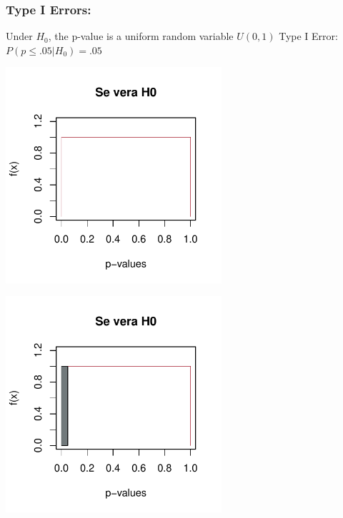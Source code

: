 \documentclass[xcolor={pdftex,dvipsnames,table}]{beamer}
\begin{document}
\begin{frame}
\frametitle{Type I Errors:}

\begin{overprint}
 {Under $H_0$, the p-value is a uniform random variable $U(0,1)$}
 {Type I Error: $P(p\leq .05 |H_0)=.05$} %
\end{overprint} 
\begin{overprint} 
 \centerline{\includegraphics[width=8cm]{plaatjes/uniform1}}
 \centerline{\includegraphics[width=8cm]{plaatjes/uniform2}}
\end{overprint} 
\end{frame}
\end{document}
